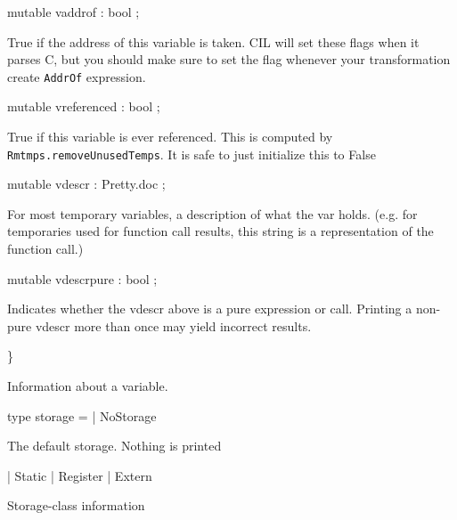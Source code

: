 \documentclass[11pt]{article}
\begin{document}
\begin{ocamldoccode}
  mutable vaddrof : bool ;
\end{ocamldoccode}
\begin{ocamldoccomment}
True if the address of this variable is taken. CIL will set these 
 flags when it parses C, but you should make sure to set the flag 
 whenever your transformation create {\tt{AddrOf}} expression.
\end{ocamldoccomment}
\begin{ocamldoccode}
  mutable vreferenced : bool ;
\end{ocamldoccode}
\begin{ocamldoccomment}
True if this variable is ever referenced. This is computed by 
 {\tt{Rmtmps.removeUnusedTemps}}. It is safe to just initialize this to False
\end{ocamldoccomment}
\begin{ocamldoccode}
  mutable vdescr : Pretty.doc ;
\end{ocamldoccode}
\begin{ocamldoccomment}
For most temporary variables, a description of what the var holds.
  (e.g. for temporaries used for function call results, this string
   is a representation of the function call.)
\end{ocamldoccomment}
\begin{ocamldoccode}
  mutable vdescrpure : bool ;
\end{ocamldoccode}
\begin{ocamldoccomment}
Indicates whether the vdescr above is a pure expression or call.
  Printing a non-pure vdescr more than once may yield incorrect
  results.
\end{ocamldoccomment}
\begin{ocamldoccode}
\}
\end{ocamldoccode}
\begin{ocamldocdescription}
Information about a variable.


\end{ocamldocdescription}




\label{type:Cil.storage}\begin{ocamldoccode}
type storage =
  | NoStorage
\end{ocamldoccode}
\begin{ocamldoccomment}
The default storage. Nothing is printed
\end{ocamldoccomment}
\begin{ocamldoccode}
  | Static
  | Register
  | Extern
\end{ocamldoccode}
\begin{ocamldocdescription}
Storage-class information


\end{ocamldocdescription}
\end{document}

